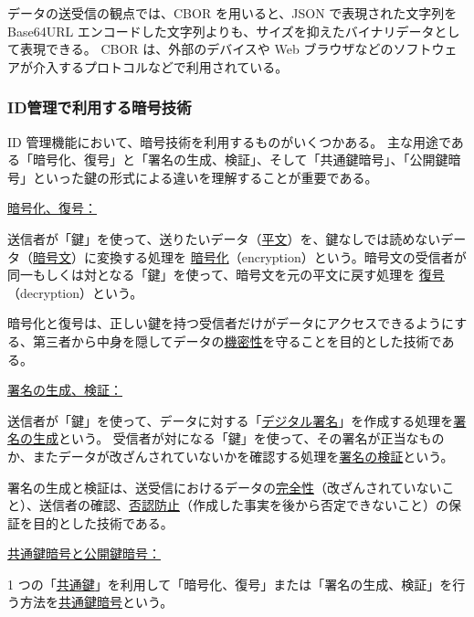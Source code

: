 \documentclass[uplatex]{jsarticle}
\def\label#1{}%
\begin{document}
データの送受信の観点では、CBOR を用いると、JSON で表現された文字列を Base64URL エンコードした文字列よりも、サイズを抑えたバイナリデータとして表現できる。
CBOR は、外部のデバイスや Web ブラウザなどのソフトウェアが介入するプロトコルなどで利用されている。

\subsubsection{ID管理で利用する暗号技術}

ID 管理機能において、暗号技術を利用するものがいくつかある。
主な用途である「暗号化、復号」と「署名の生成、検証」、そして「共通鍵暗号」、「公開鍵暗号」といった鍵の形式による違いを理解することが重要である。

\underline{暗号化、復号：}

\begin{dfn}[暗号化と復号]\label{dfn:ch6-encryption}
送信者が「鍵」を使って、送りたいデータ（\underline{平文}）を、鍵なしでは読めないデータ（\underline{暗号文}）に変換する処理を
\underline{暗号化}（encryption）という。暗号文の受信者が同一もしくは対となる「鍵」を使って、暗号文を元の平文に戻す処理を
\underline{復号}（decryption）という。
\end{dfn}

暗号化と復号は、正しい鍵を持つ受信者だけがデータにアクセスできるようにする、第三者から中身を隠してデータの\underline{機密性}を守ることを目的とした技術である。

\underline{署名の生成、検証：}

\begin{dfn}[署名の生成と検証]\label{dfn:ch6-signature}
送信者が「鍵」を使って、データに対する「\underline{デジタル署名}」を作成する処理を\underline{署名の生成}という。
受信者が対になる「鍵」を使って、その署名が正当なものか、またデータが改ざんされていないかを確認する処理を\underline{署名の検証}という。
\end{dfn}

署名の生成と検証は、送受信におけるデータの\underline{完全性}（改ざんされていないこと）、送信者の確認、\underline{否認防止}（作成した事実を後から否定できないこと）の保証を目的とした技術である。

\underline{共通鍵暗号と公開鍵暗号：}

\begin{dfn}[共通鍵暗号]\label{dfn:ch6-symmetric-key}
1 つの「\underline{共通鍵}」を利用して「暗号化、復号」または「署名の生成、検証」を行う方法を\underline{共通鍵暗号}という。
\end{dfn}
\end{document}
